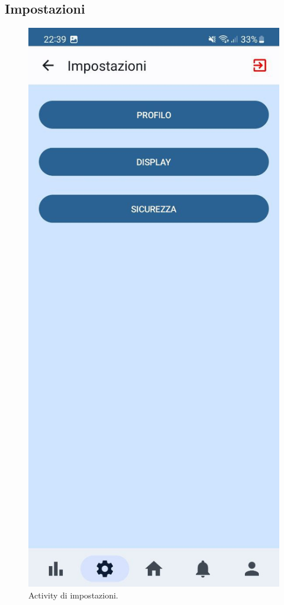 \documentclass[a4paper,final,12pt]{report}
\begin{document}
\subsection{Impostazioni}
\begin{figure}[hbtp]
\centering
\includegraphics[scale=0.20]{img_concettuale/impmob.jpg}
\caption{Activity di impostazioni.}
\label{figura:actimpost}
\end{figure}
\end{document}
